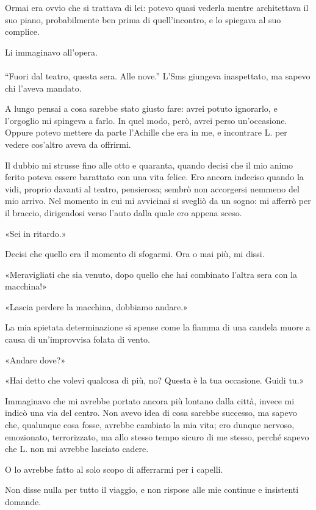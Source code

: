 \documentclass[a4paper,12pt]{book}
\begin{document}
Ormai era ovvio che si trattava di lei: potevo quasi vederla mentre architettava
il suo piano, probabilmente ben prima di quell’incontro, e lo spiegava al suo
complice.

Li immaginavo all’opera.

\paragraph{}
``Fuori dal teatro, questa sera. Alle nove.''
L’Sms giungeva inaspettato, ma sapevo chi l’aveva mandato.

A lungo pensai a cosa sarebbe stato giusto fare: avrei potuto ignorarlo, e
l’orgoglio mi spingeva a farlo. In quel modo, però, avrei perso
un’occasione. Oppure potevo mettere da parte l’Achille che era in me, e
incontrare L. per vedere cos’altro aveva da offrirmi.

Il dubbio mi strusse fino alle otto e quaranta, quando decisi che il mio animo
ferito poteva essere barattato con una vita felice. Ero ancora indeciso quando
la vidi, proprio davanti al teatro, pensierosa; sembrò non accorgersi nemmeno
del mio arrivo. Nel momento in cui mi avvicinai si svegliò da un sogno: mi
afferrò per il braccio, dirigendosi verso l’auto dalla quale ero appena
sceso.

«Sei in ritardo.»

Decisi che quello era il momento di sfogarmi. Ora o mai più, mi dissi.

«Meravigliati che sia venuto, dopo quello che hai combinato l’altra sera con
la macchina!»

«Lascia perdere la macchina, dobbiamo andare.»

La mia spietata determinazione si spense come la fiamma di una candela muore a
causa di un’improvvisa folata di vento.

«Andare dove?»

«Hai detto che volevi qualcosa di più, no? Questa è la tua occasione. Guidi
tu.»

Immaginavo che mi avrebbe portato ancora più lontano dalla città, invece mi
indicò una via del centro. Non avevo idea di cosa sarebbe successo, ma sapevo
che, qualunque cosa fosse, avrebbe cambiato la mia vita; ero dunque nervoso,
emozionato, terrorizzato, ma allo stesso tempo sicuro di me stesso, perché
sapevo che L. non mi avrebbe lasciato cadere.

O lo avrebbe fatto al solo scopo di afferrarmi per i capelli.

Non disse nulla per tutto il viaggio, e non rispose alle mie continue e
insistenti domande.
\end{document}
